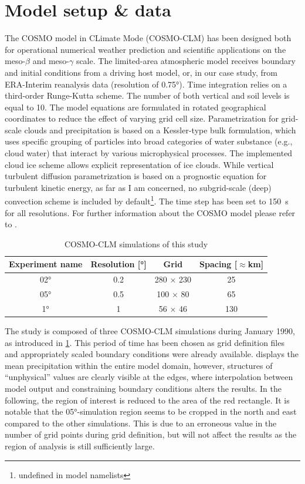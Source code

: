 \section{Model setup \& data}

The COSMO model in CLimate Mode (COSMO-CLM) has been designed both for operational numerical weather prediction and scientific applications on the meso-\(\beta\) and meso-\(\gamma\) scale. The limited-area atmospheric model receives boundary and initial conditions from a driving host model, or, in our case study, from ERA-Interim reanalysis data (resolution of 0.75°). Time integration relies on a third-order Runge-Kutta scheme. The number of both vertical and soil levels is equal to 10. The model equations are formulated in rotated geographical coordinates to reduce the effect of varying grid cell size. Parametrization for grid-scale clouds and precipitation is based on a Kessler-type bulk formulation, which uses specific grouping of particles into broad categories of water substance (e.g., cloud water) that interact by various microphysical processes. The implemented cloud ice scheme allows explicit representation of ice clouds. While vertical turbulent diffusion parametrization is based on a prognostic equation for turbulent kinetic energy, as far as I am concerned, no subgrid-scale (deep) convection scheme is included by default\footnote{ undefined in model namelists}.   
The time step has been set to \SI{150}{\s} for all resolutions. For further information about the COSMO model please refer to \textcite{schaettler2021}.


\begin{table}
	\centering
	\begin{tabular}{cccc}
		\toprule
		Experiment name & Resolution [°] & Grid & Spacing [\(\approx\)km] \\
		\midrule
		02° & 0.2 & 280 \(\times\) 230 & 25 \\
		05° & 0.5 & 100 \(\times\) 80  & 65 \\
		1° & 1 & 56 \(\times\) 46      & 130 \\
		\bottomrule
	\end{tabular}
	\caption{COSMO-CLM simulations of this study}
	\label{tab:sims}
\end{table}

The study is composed of three COSMO-CLM simulations during January 1990, as introduced in \cref{tab:sims}. This period of time has been chosen as grid definition files and appropriately scaled boundary conditions were already available.  displays the mean precipitation within the entire model domain, however, structures of \enquote{unphysical} values are clearly visible at the edges, where interpolation between model output and constraining boundary conditions alters the results. In the following, the region of interest is reduced to the area of the red rectangle. It is notable that the 05°-simulation region seems to be cropped in the north and east compared to the other simulations. This is due to an erroneous value in the number of grid points during grid definition, but will not affect the results as the region of analysis is still sufficiently large. 

